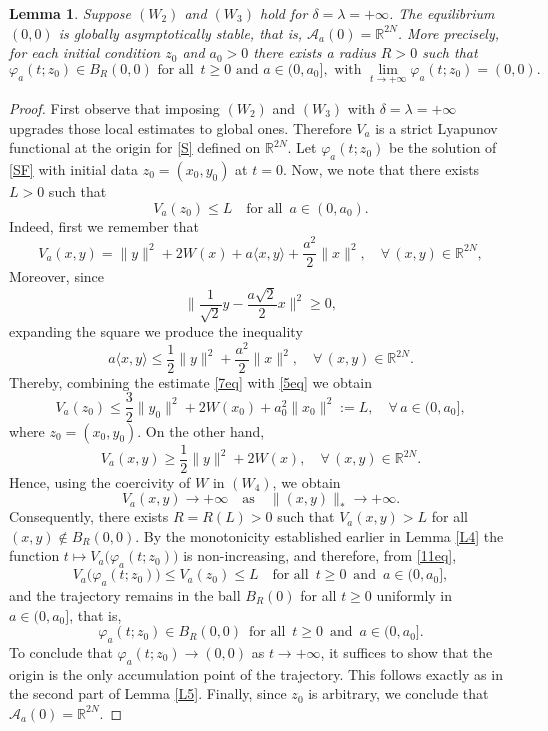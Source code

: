 \documentclass[12pt]{amsart}
\numberwithin{equation}{section}
\newtheorem{lemma}[theorem]{Lemma}
\begin{document}
\begin{lemma}\label{L6}
	Suppose \hyperlink{W2}{$(W_2)$} and \hyperlink{W3}{$(W_3)$} hold for $\delta =\lambda=+\infty$. The equilibrium $(0,0)$ is globally asymptotically stable, that is, $\mathcal{A}_a(0)=\mathbb{R}^{2N}$. More precisely, for each initial condition $z_0$ and $a_0>0$ there exists a radius $R>0$ such that
	$$
	\varphi_a(t;z_0)\in B_R(0,0) \text{ for all }\, t\ge0  \text{ and } a\in (0,a_0],  \text{ with } \lim_{t\to+\infty}\varphi_a(t;z_0)=(0,0).
	$$
\end{lemma}
\begin{proof}
First observe that imposing \hyperlink{W2}{$(W_2)$} and \hyperlink{W3}{$(W_3)$} with $\delta=\lambda=+\infty$ upgrades those local estimates to global ones. Therefore $V_a$ is a strict Lyapunov functional at the origin for \eqref{S} defined on $\mathbb{R}^{2N}$. Let $\varphi_a(t;z_0)$ be the solution of \eqref{SF} with initial data $z_0=(x_0,y_0)$ at $t=0$. Now, we note that there exists $L>0$ such that 
\begin{equation}\label{11eq}
	V_a(z_0)\le L\quad\text{for all }\, a\in (0,a_0).
\end{equation}
Indeed, first we remember that	
\begin{equation}\label{5eq}
	V_a(x,y)= \|y\|^2 + 2W(x) + a\langle x,y\rangle + \frac{a^2}{2}\|x\|^2,\quad \forall \, (x,y) \in \mathbb{R}^{2N},
\end{equation} 
Moreover, since
$$
\Big\| \frac{1}{\sqrt{2}}y - \frac{a\sqrt{2}}{2}x \Big\|^2\ge 0,
$$ 
expanding the square we produce the inequality 
\begin{equation}\label{7eq}
	a\langle x,y\rangle \le \frac{1}{2}\|y\|^2 + \frac{a^2}{2}\|x\|^2,\quad \forall \, (x,y) \in \mathbb{R}^{2N}.
\end{equation}
Thereby, combining the estimate \eqref{7eq} with \eqref{5eq} we obtain 
$$
V_a(z_0) \le \frac32\|y_0\|^2+2W(x_0)+a_0^2\|x_0\|^2:=L,\quad\forall\,  a\in(0,a_0],
$$
where $z_0=(x_0,y_0)$. On the other hand, 
$$
V_a(x,y) \ge \dfrac12\|y\|^2+2W(x),\quad \forall\,(x,y)\in\mathbb{R}^{2N}.
$$
Hence, using the coercivity of $W$ in \hyperlink{W4}{$(W_4)$}, we obtain
$$
V_a(x,y)\to +\infty\quad\text{as}\quad \|(x,y)\|_*\to +\infty .
$$
Consequently, there exists $R=R(L)>0$ such that $V_a(x,y)>L$ for all $(x,y)\notin B_R(0,0)$. By the monotonicity established earlier in Lemma \ref{L4} the function $t\mapsto V_a\big(\varphi_a(t;z_0)\big)$ is non-increasing, and therefore, from \eqref{11eq},
$$
V_a\big(\varphi_a(t;z_0)\big)\le V_a(z_0)\le L \quad \text{for all }\,  t\ge0\, \text{ and }\, a\in (0,a_0],
$$
and the trajectory remains in the ball $B_R(0)$ for all $t\ge0$ uniformly in $a\in (0,a_0]$, that is,
$$
\varphi_a(t;z_0)\in B_R(0,0)\,  \text{ for all }\,  t\ge0\, \text{ and }\, a\in (0,a_0].
$$
To conclude that $\varphi_a(t;z_0)\to(0,0)$ as $t\to+\infty$, it suffices to show that the origin is the only accumulation point of the trajectory. This follows exactly as in the second part of Lemma \ref{L5}. Finally, since $z_0$ is arbitrary, we conclude that $\mathcal{A}_a(0)=\mathbb{R}^{2N}$.
\end{proof}
\end{document}
